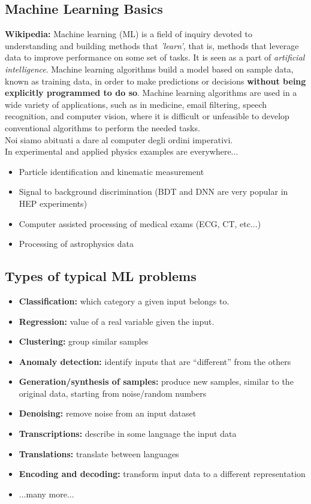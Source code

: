 \subsection{Machine Learning Basics}
\textbf{Wikipedia:} Machine learning (ML) is a field of inquiry devoted to understanding and building methods that \textit{'learn'}, that is, methods that leverage data to improve performance on some set of tasks. It is seen as a part of \textit{artificial intelligence}. Machine learning algorithms build a model based on sample data, known as training data, in order to make predictions or decisions \textbf{without being explicitly programmed to do so}. Machine learning algorithms are used in a wide variety of applications, such as in medicine, email filtering, speech recognition, and computer vision, where it is difficult or unfeasible to develop conventional algorithms to perform the needed tasks.\\

Noi siamo abituati a dare al computer degli ordini imperativi.\\

In experimental and applied physics examples are everywhere...
\begin{itemize}
	\item Particle identification and kinematic measurement
	\item Signal to background discrimination (BDT and DNN are very popular in HEP experiments)
	\item Computer assisted processing of medical exams (ECG, CT, etc...)
	\item Processing of astrophysics data
\end{itemize}

\subsection{Types of typical ML problems}


\begin{itemize}
	\item \textbf{Classification:} which category a given input belongs to. 
	\item \textbf{Regression:} value of a real variable given the input.
	\item \textbf{Clustering:} group similar samples
	\item \textbf{Anomaly detection:} identify inputs that are “different” from the others
	\item \textbf{Generation/synthesis of samples:} produce new samples, similar to the original data, starting from noise/random numbers
	\item \textbf{Denoising:} remove noise from an input dataset
	\item \textbf{Transcriptions:} describe in some language the input data
	\item \textbf{Translations:} translate between languages
	\item \textbf{Encoding and decoding:} transform input data to a different representation
	\item ...many more...
\end{itemize}

